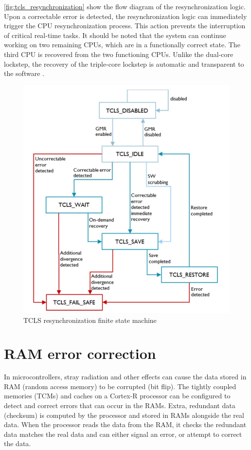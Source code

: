 \autoref{fig:tcls_resynchronization} show the flow diagram of the resynchronization logic. Upon a correctable error is detected, the resynchronization logic can immediately trigger the CPU resynchronization process. This action prevents the interruption of critical real-time tasks. It should be noted that the system can continue working on two remaining CPUs, which are in a functionally correct state. The third CPU is recovered from the two functioning CPUs. Unlike the dual-core lockstep, the recovery of the triple-core lockstep is automatic and transparent to the software \citep{TCLS_cortex_r}.

\begin{figure}[H]

      \centering
      \includegraphics[width=0.9\linewidth]{images/tcls_resynchronization.png}
      \caption{TCLS resynchronization finite state machine \citep{TCLS_cortex_r}}
      \label{fig:tcls_resynchronization}
    
\end{figure}

\section{RAM error correction}

In microcontrollers, stray radiation and other effects can cause the data stored in RAM (random access memory) to be corrupted (bit flip).  The tightly coupled memories (TCMs) and caches on a Cortex-R processor can be configured to detect and correct errors that can occur in the RAMs. Extra, redundant data (checksum) is computed by the processor and stored in RAMs alongside the real data. When the processor reads the data from the RAM, it checks the redundant data matches the real data and can either signal an error, or attempt to correct the data.

